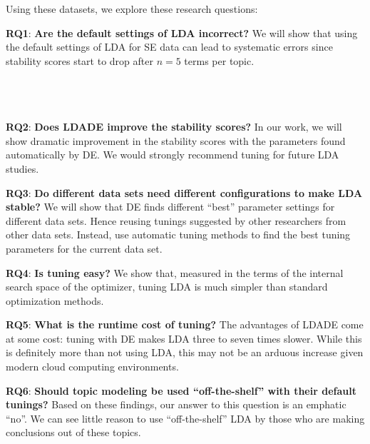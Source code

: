 \documentclass[10pt,conference]{IEEEtran}
\theoremstyle{break}
\begin{document}
\noindent
Using these datasets, we explore these research questions:  
\begin{compactitem}
\item \textbf{RQ1}: \textbf{Are the default settings of LDA incorrect?} We will show that using the default settings of LDA for SE data can lead to systematic errors since stability scores start to drop after $n=5$ terms per topic. \\ \\ \\ \\
    \item \textbf{RQ2}: \textbf{Does LDADE improve the stability scores?} In our work, we will show dramatic improvement in the stability scores with the parameters found automatically by DE. We would strongly recommend tuning for future LDA studies.
    \item \textbf{RQ3}: \textbf{Do different data sets
      need different configurations to make LDA stable?} We will show that DE finds different ``best'' parameter settings for different data sets. Hence reusing tunings  suggested  by  other  researchers  from other  data  sets.  Instead,  use  automatic  tuning  methods  to find the best tuning parameters for the current data set.
    \item \textbf{RQ4}: \textbf{Is tuning easy?} We show that, measured
      in the terms of the internal search space of the optimizer,
      tuning LDA is much simpler than standard optimization methods.
    \item \textbf{RQ5}: \textbf{What is the runtime cost of tuning?}
      The advantages of  LDADE come at some cost:
      tuning with DE makes LDA three to seven times slower.
      While this is definitely more than not using LDA, this may not be an arduous increase
      given modern cloud computing environments. 
    \item \textbf{RQ6}: \textbf{Should topic modeling be used “off-the-shelf” with their default tunings?}
      Based on these findings, our answer to this question is an emphatic ``no''. We can see little reason to use ``off-the-shelf''  LDA by those who are making conclusions out of these topics.
\end{compactitem}
\end{document}
